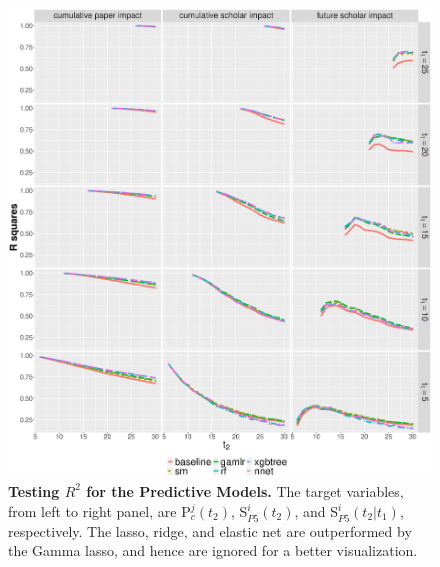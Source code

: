 \begin{figure}[ht!]
    \centering
    \includegraphics[width=\textwidth]{figures/pred_model/r2.eps}
    \caption{{\bf Testing $R^2$ for the Predictive Models.} The target variables, from left to right panel, are P$_c^{j}(t_2)$, S$_{P5}^{i}(t_2)$, and S$_{P5}^{i}(t_2|t_1)$, respectively. The lasso, ridge, and elastic net are outperformed by the Gamma lasso, and hence are ignored for a better visualization.}
    \label{fig:pred_r2}
\end{figure}


